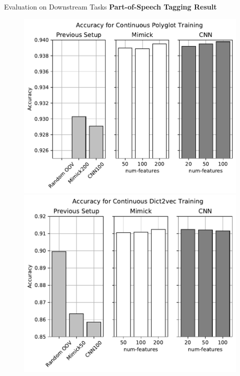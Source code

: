 \documentclass{beamer}
\begin{document}
\begin{frame}{Evaluation on Downstream Tasks}
    \textbf{Part-of-Speech Tagging Result}
    \begin{figure}[H]
        \centering
        \begin{minipage}{.48\textwidth}
            \includegraphics[width=\linewidth]{images/continuous_polyglot}
        \end{minipage}
        \begin{minipage}{.48\textwidth}
            \includegraphics[width=\linewidth]{images/continuous_dict2vec}
        \end{minipage}
    \end{figure}
\end{frame}
\end{document}
